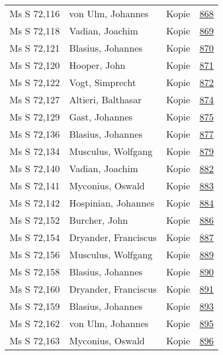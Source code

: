\documentclass[10pt,a4paper,landscape]{report}
\begin{document}
\begin{longtable}{p{16cm}p{4cm}lr}
Ms S 72,116	&	von Ulm, Johannes	&	Kopie	&	\href{http://130.60.24.72/assignment/868}{868}\\
Ms S 72,118	&	Vadian, Joachim	&	Kopie	&	\href{http://130.60.24.72/assignment/869}{869}\\
Ms S 72,121	&	Blasius, Johannes	&	Kopie	&	\href{http://130.60.24.72/assignment/870}{870}\\
Ms S 72,120	&	Hooper, John	&	Kopie	&	\href{http://130.60.24.72/assignment/871}{871}\\
Ms S 72,122	&	Vogt, Simprecht	&	Kopie	&	\href{http://130.60.24.72/assignment/872}{872}\\
Ms S 72,127	&	Altieri, Balthasar	&	Kopie	&	\href{http://130.60.24.72/assignment/874}{874}\\
Ms S 72,129	&	Gast, Johannes	&	Kopie	&	\href{http://130.60.24.72/assignment/875}{875}\\
Ms S 72,136	&	Blasius, Johannes	&	Kopie	&	\href{http://130.60.24.72/assignment/877}{877}\\
Ms S 72,134	&	Musculus, Wolfgang	&	Kopie	&	\href{http://130.60.24.72/assignment/879}{879}\\
Ms S 72,140	&	Vadian, Joachim	&	Kopie	&	\href{http://130.60.24.72/assignment/882}{882}\\
Ms S 72,141	&	Myconius, Oswald	&	Kopie	&	\href{http://130.60.24.72/assignment/883}{883}\\
Ms S 72,142	&	Hospinian, Johannes	&	Kopie	&	\href{http://130.60.24.72/assignment/884}{884}\\
Ms S 72,152	&	Burcher, John	&	Kopie	&	\href{http://130.60.24.72/assignment/886}{886}\\
Ms S 72,154	&	Dryander, Franciscus	&	Kopie	&	\href{http://130.60.24.72/assignment/887}{887}\\
Ms S 72,156	&	Musculus, Wolfgang	&	Kopie	&	\href{http://130.60.24.72/assignment/889}{889}\\
Ms S 72,158	&	Blasius, Johannes	&	Kopie	&	\href{http://130.60.24.72/assignment/890}{890}\\
Ms S 72,160	&	Dryander, Franciscus	&	Kopie	&	\href{http://130.60.24.72/assignment/891}{891}\\
Ms S 72,159	&	Blasius, Johannes	&	Kopie	&	\href{http://130.60.24.72/assignment/893}{893}\\
Ms S 72,162	&	von Ulm, Johannes	&	Kopie	&	\href{http://130.60.24.72/assignment/895}{895}\\
Ms S 72,163	&	Myconius, Oswald	&	Kopie	&	\href{http://130.60.24.72/assignment/896}{896}\\

\end{longtable}
\end{document}
